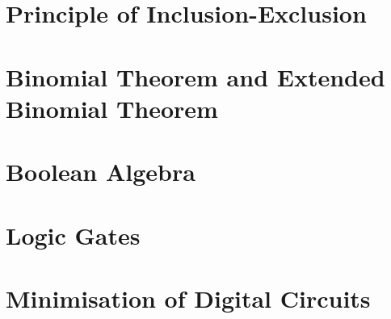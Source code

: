 \section{Principle of Inclusion-Exclusion}
\label{sec:InclusionExclusion}

\section{Binomial Theorem and Extended Binomial Theorem}
\label{sec:BinomialTheorem}

\section{Boolean Algebra}
\label{sec:BooleanAlgebra}

\section{Logic Gates}
\label{sec:LogicGates}

\section{Minimisation of Digital Circuits}


\newpage
